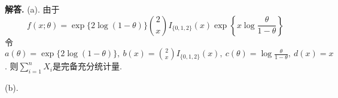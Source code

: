 \documentclass[12pt, a4paper, oneside]{ctexart}
\newenvironment{solution}[1][]{\par\noindent\textbf{#1解答. }}{\smallskip\par}  %
\begin{document}
\begin{solution}
    (a). 由于
    \begin{equation*}
        f(x;\theta) = \exp\{2\log(1-\theta)\}\binom{2}{x}I_{\{0,1,2\}}(x)\exp\left\{x\log\frac{\theta}{1-\theta}\right\}   
    \end{equation*}
    令$a(\theta) = \exp\{2\log(1-\theta)\},\ b(x) = \binom{2}{x}I_{\{0,1,2\}}(x),\ c(\theta) = \log\frac{\theta}{1-\theta},\ d(x) = x$. 则$\sum_{i=1}^nX_i$是完备充分统计量.

    (b). 
\end{solution}

\iffalse
\centerline{
    \texttt{[image: figure.png]}
}
\renewcommand\arraystretch{0.8} %
\begin{table}[!htbp] %
    \centering %
    \begin{tabular}{p{1cm}<{\centering}p{1cm}<{\centering}p{3cm}<{\centering}p{5cm}<{\centering}} %
        \toprule
        $x_i$ & $f[x_1]$ & $f[x_i,x_{i+1}]$ & $f[x_i,x_{i+1},x_{i+2}]$ \\
        \midrule
        $x_0$ & $f(x_0)$ &                  &                          \\
        $x_0$ & $f(x_0)$ & $f'(x_0)$        &                          \\
        $x_0$ & $f(x_1)$ & $\frac{f(x_1)-f(x_0)}{x_1-x_0}$ & $\frac{f(x_1)-f(x_0)}{(x_1-x_0)^2}-\frac{f'(x_0)}{x_1-x_0}$\\
        \bottomrule
    \end{tabular}
\end{table}

\def\Log{\text{Log}} %
$\Log$ %
\fi
\end{document}
